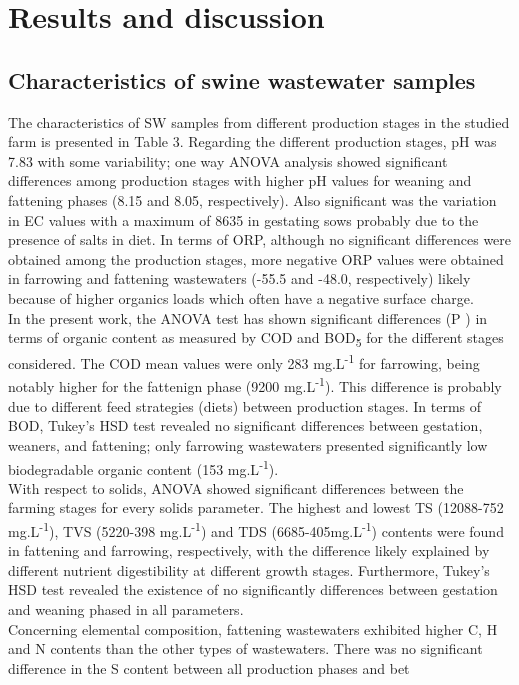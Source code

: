 \section{Results and discussion}
\subsection{Characteristics of swine wastewater samples}
The characteristics of SW samples from different production stages in the studied farm is presented in Table 3. Regarding the different production stages, pH was 7.83 with some variability; one way ANOVA analysis showed significant differences among production stages with higher pH values for weaning and fattening phases (8.15 and 8.05, respectively). Also significant was the variation in EC values with a maximum of 8635 in gestating sows probably due to the presence of salts in diet. In terms of ORP, although no significant differences were obtained among the production stages, more negative ORP values were obtained in farrowing and fattening wastewaters (-55.5 and -48.0, respectively) likely because of higher organics loads which often have a negative surface charge.\\
In the present work, the ANOVA test has shown significant differences (P ) in terms of organic content as measured by COD and BOD\textsubscript{5} for the different stages considered. The COD mean values were only 283 mg.L\textsuperscript{-1} for farrowing, being notably higher for the fattenign phase (9200 mg.L\textsuperscript{-1}). This difference is probably due to different feed strategies (diets) between production stages. In terms of BOD, Tukey’s HSD test revealed no significant differences between gestation, weaners, and fattening; only farrowing wastewaters presented significantly low biodegradable organic content (153 mg.L\textsuperscript{-1}).\\
With respect to solids, ANOVA showed significant differences between the farming stages for every solids parameter. The highest and lowest TS (12088-752 mg.L\textsuperscript{-1}), TVS (5220-398 mg.L\textsuperscript{-1}) and TDS (6685-405mg.L\textsuperscript{-1}) contents were found in fattening and farrowing, respectively, with the difference likely explained by different nutrient digestibility at different growth stages. Furthermore, Tukey’s HSD test revealed the existence of no significantly differences between gestation and weaning phased in all parameters.\\
Concerning elemental composition, fattening wastewaters exhibited higher C, H and N contents than the other types of wastewaters. There was no significant difference in the S content between all production phases and bet